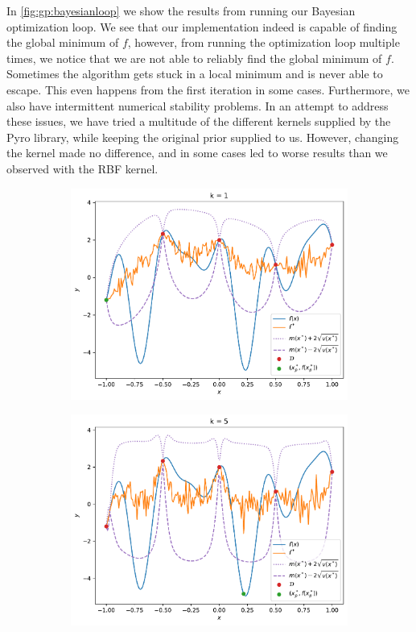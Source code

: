In \cref{fig:gp:bayesianloop} we show the results from running our Bayesian optimization loop. We see that our implementation indeed is capable of finding the global minimum of $f$,
however, from running the optimization loop multiple times, we notice that we are not able to reliably find the global minimum of $f$. Sometimes the algorithm gets stuck in a local minimum and is never able to escape. This even happens from the first iteration in some cases. Furthermore, we also have intermittent numerical stability problems. In an attempt to address these issues, we have tried a multitude of the different kernels supplied by the Pyro library, while keeping the original prior supplied to us. However, changing the kernel made no difference, and in some cases led to worse results than we observed with the RBF kernel.

\begin{figure}%
    \begin{subfigure}[t]{0.32\textwidth}
        \centering
        \includegraphics[width=\textwidth]{figures/gp/b2-k_1.pdf}
    \end{subfigure}
    \begin{subfigure}[t]{0.32\textwidth}
        \centering
        \includegraphics[width=\textwidth]{figures/gp/b2-k_5.pdf}

\end{subfigure}
\end{figure}
